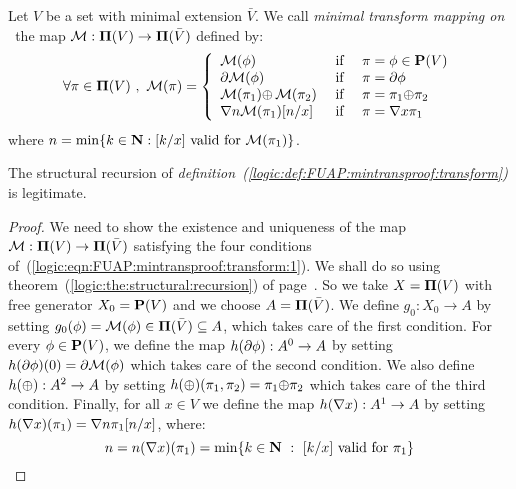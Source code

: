 \begin{defin}\label{logic:def:FUAP:mintransproof:transform}
Let $V$ be a set with minimal extension $\bar{V}$. We call {\em
minimal transform mapping on \pvs\ }the map ${\cal
M}:\mbox{${\bf\Pi}(V)$}\to{\bf\Pi}(\bar{V})$ defined by:
\begin{equation}\label{logic:eqn:FUAP:mintransproof:transform:1}
    \forall\pi\in\pvs\ ,\ {\cal M}(\pi)=\left\{
                    \begin{array}{lcl}
                    {\cal M}(\phi)&\mbox{\ if\ }&\pi=\phi\in\pv\\
                    \axi{\cal M}(\phi)&\mbox{\ if\ }&\pi=\axi\phi\\
                    {\cal M}(\pi_{1})\pon\,{\cal M}(\pi_{2})&\mbox{\ if\ }&\pi=\pi_{1}\pon\pi_{2}\\
                    \gen n{\cal M}(\pi_{1})[n/x]&\mbox{\ if\ }&\pi=\gen
                    x\pi_{1}
                    \end{array}\right.
    \end{equation}
where $n=\min\{k\in\mbox{$\bf N$}:\mbox{$[k/x]$ valid for ${\cal
M}(\pi_{1})$}\}$.
\end{defin}
\begin{prop}\label{logic:prop:FUAP:mintransproof:recursion}
The structural recursion of {\em
definition~(\ref{logic:def:FUAP:mintransproof:transform})} is
legitimate.
\end{prop}
\begin{proof}
We need to show the existence and uniqueness of the map ${\cal
M}:\mbox{${\bf\Pi}(V)$}\to{\bf\Pi}(\bar{V})$ satisfying the four conditions
of~(\ref{logic:eqn:FUAP:mintransproof:transform:1}). We shall do so
using theorem~(\ref{logic:the:structural:recursion}) of
page~\pageref{logic:the:structural:recursion}. So we take $X=\mbox{${\bf\Pi}(V)$}$
with free generator $X_{0}=\mbox{${\bf P}(V)$}$ and we choose $A={\bf\Pi}(\bar{V})$.
We define $g_{0}:X_{0}\to A$ by setting $g_{0}(\phi)={\cal
M}(\phi)\in\mbox{${\bf\Pi}(\bar{V})$}\subseteq A$, which takes care of the first
condition. For every $\phi\in\mbox{${\bf P}(V)$}$, we define the map
$h(\mbox{$\partial$}\phi):A^{0}\to A$ by setting $h(\mbox{$\partial$}\phi)(0)=\mbox{$\partial$}{\cal
M}(\phi)$ which takes care of the second condition. We also define
$h(\mbox{$\oplus$}):A^{2}\to A$ by setting
$h(\mbox{$\oplus$})(\pi_{1},\pi_{2})=\pi_{1}\mbox{$\oplus$}\pi_{2}$ which takes care of
the third condition. Finally, for all $x\in V$ we define the map
$h(\mbox{$\nabla$} x):A^{1}\to A$ by setting $h(\mbox{$\nabla$} x)(\pi_{1})=\mbox{$\nabla$}
n\pi_{1}[n/x]$, where:
    \[
    n=n(\mbox{$\nabla$} x)(\pi_{1})=\min\{k\in\mbox{$\bf N$}\ :\ [k/x]\mbox{ valid for }\pi_{1}\}
    \]
\end{proof}

